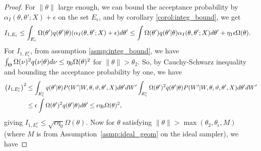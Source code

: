 \begin{proof}
%
For $\|\theta\|$ large enough, we can bound the acceptance probability 
by $\alpha_I(\theta,\theta'; X) + \epsilon$ on the set $E_\epsilon$, and by corollary 
\ref{corol:integ_bound}, we get 
\begin{align*}
  I_{1,E_\epsilon} & \leq \int_{E_\epsilon} \Omega(\theta')q(\theta' | \theta) (\alpha_I(\theta, \theta'; X) + \epsilon) d\theta' 
 \leq \int \Omega(\theta')q(\theta' | \theta) \alpha_I(\theta, \theta'; X) d\theta' + \eta_1 \epsilon \Omega(\theta).
\end{align*}
For $I_{1,E_\epsilon^c}$, 
from assumption \ref{asmp:integ_bound}, %
we have $\int_\Theta \Omega(\nu)^2 q(\nu | \theta)d\nu \leq \eta_0 \Omega(\theta)^2$
for $\|\theta\| > \theta_2$.
So, by Cauchy-Schwarz inequality and bounding the acceptance probability by one, we have
\begin{align*}
  \left( I_{1,E_\epsilon^c}\right)^2 %
& \le \int_{\E_\epsilon^c} q(\theta' | \theta) P(W' |W, \theta, \vartheta, \theta', X)d\theta'dW'  \int_{\E_\epsilon^c}  \Omega(\theta')^2 q(\theta' | \theta) P(W' |W, \theta, \vartheta, \theta', X)d\theta'dW'   \\
& \le \epsilon \int  \Omega(\theta')^2 q(\theta' | \theta)d\theta' 
 \le \epsilon \eta_0 \Omega(\theta)^2 ,
\end{align*}
giving
$
I_{1,E_\epsilon^c}  \le \sqrt{\epsilon \eta_0 }\Omega(\theta) .
$
Now for $\theta$ satisfying $ \| \theta \| >\max(\theta_2, 
\theta_\epsilon, M) $ 
(where $M$ is from Assumption~\ref{asmp:ideal_geom} on 
the ideal sampler), we have 

\end{proof}
